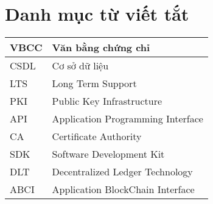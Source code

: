 \chapter*{Danh mục từ viết tắt}
\begin{center}
\renewcommand{\arraystretch}{1.5}
\begin{longtable}{ |l @{\qquad} |l| }
\hline
VBCC   & Văn bằng chứng chỉ  \\ \hline
CSDL   & Cơ sở dữ liệu  \\ \hline
LTS  &  Long Term Support  \\ \hline
PKI  &  Public Key Infrastructure \\ \hline
API    & Application Programming Interface  \\ \hline
CA    & Certificate Authority \\ \hline
SDK    & Software Development Kit \\ \hline
DLT & Decentralized Ledger Technology \\ \hline
ABCI & Application BlockChain Interface \\ \hline
\end{longtable}
\end{center}
